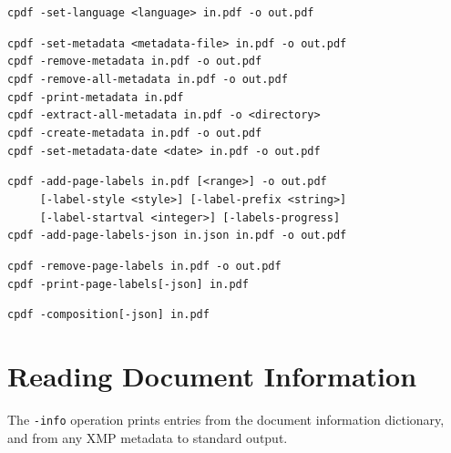 \documentclass{book}
\begin{document}
\begin{framed}
    \vspace{1.5mm}
    \small\noindent\verb!cpdf -set-language <language> in.pdf -o out.pdf!

    \vspace{1.5mm}
    \small\noindent\verb!cpdf -set-metadata <metadata-file> in.pdf -o out.pdf!\\
    \small\noindent\verb!cpdf -remove-metadata in.pdf -o out.pdf!\\
    \small\noindent\verb!cpdf -remove-all-metadata in.pdf -o out.pdf!\\
    \small\noindent\verb!cpdf -print-metadata in.pdf!\\
    \small\noindent\verb!cpdf -extract-all-metadata in.pdf -o <directory>!\\
    \small\noindent\verb!cpdf -create-metadata in.pdf -o out.pdf!\\
    \small\noindent\verb!cpdf -set-metadata-date <date> in.pdf -o out.pdf!
    
    \vspace{1.5mm}
    \small\noindent\verb!cpdf -add-page-labels in.pdf [<range>] -o out.pdf!\\
    \noindent\verb!     [-label-style <style>] [-label-prefix <string>]!\\
    \noindent\verb!     [-label-startval <integer>] [-labels-progress]!\\
    \noindent\verb!cpdf -add-page-labels-json in.json in.pdf -o out.pdf!

    \vspace{1.5mm}
    \small\noindent\verb!cpdf -remove-page-labels in.pdf -o out.pdf!\\
    \small\noindent\verb!cpdf -print-page-labels[-json] in.pdf!

    \vspace{1.5mm}
    \small\noindent\verb!cpdf -composition[-json] in.pdf!
  \end{framed}
 
\section{Reading Document Information}
\label{info}
The \texttt{-info} operation prints entries from the document information
dictionary, and from any XMP metadata to standard output.
\end{document}
